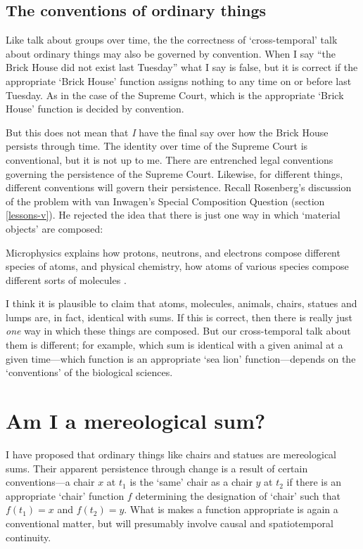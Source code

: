 \documentclass[11pt]{article}
\newenvironment{squote}{%
\begin{spacing}{1}
\begin{list}{}{%
\setlength{\labelwidth}{0pt}%
\rightmargin\leftmargin%
}
\item\relax
}{%
\end{list}%
\end{spacing}
}
\begin{document}
\begin{spacing}{1.5}
\subsection{The conventions of ordinary things}
\label{chair-ref}
Like talk about groups over time, the the correctness of
`cross-temporal' talk about ordinary things may also be governed by
convention.  When I say ``the Brick House did not exist last Tuesday''
what I say is false, but it is correct if the appropriate `Brick
House' function assigns nothing to any time on or before last Tuesday.
As in the case of the Supreme Court, which is the appropriate `Brick
House' function is decided by convention.

But this does not mean that {\em I} have the final say over how the
Brick House persists through time.  The identity over time of the
Supreme Court is conventional, but it is not up to me.  There are
entrenched legal conventions governing the persistence of the Supreme
Court.  Likewise, for different things, different conventions will
govern their persistence.  Recall Rosenberg's discussion of the
problem with van Inwagen's Special Composition Question (section
\ref{lessons-v}).  He rejected the idea that there is just one way in
which `material objects' are composed:

\begin{squote}
Microphysics explains how protons, neutrons, and electrons compose
different species of atoms, and physical chemistry, how atoms of
various species compose different sorts of molecules
\citep[706]{rosenberg1993}.
\end{squote}

I think it is plausible to claim that atoms, molecules, animals,
chairs, statues and lumps are, in fact, identical with sums.  If this
is correct, then there is really just {\em one} way in which these
things are composed.  But our cross-temporal talk about them is
different; for example, which sum is identical with a given animal at
a given time---which function is an appropriate `sea lion'
function---depends on the `conventions' of the biological sciences.\\

\section{Am I a mereological sum?}
\label{i-sum}
I have proposed that ordinary things like chairs and statues are
mereological sums.  Their apparent persistence through change is a
result of certain conventions---a chair $x$ at $t_1$ is the `same'
chair as a chair $y$ at $t_2$ if there is an appropriate `chair'
function $f$ determining the designation of `chair' such that $f(t_1)
= x$ and $f(t_2) = y$.  What is makes a function appropriate is again
a conventional matter, but will presumably involve causal and
spatiotemporal continuity.


\end{spacing}
\end{document}
